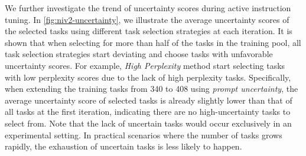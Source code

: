 We further investigate the trend of uncertainty scores during active instruction tuning.
In \autoref{fig:niv2-uncertainty}, we illustrate the average uncertainty scores of the selected tasks using different task selection strategies at each iteration. It is shown that when selecting for more than half of the tasks in the training pool, all task selection strategies start deviating and choose tasks with unfavorable uncertainty scores. For example, \textit{High Perplexity} method start selecting tasks with low perplexity scores due to the lack of high perplexity tasks. Specifically, when extending the training tasks from 340 to 408 using \textit{prompt uncertainty}, the average uncertainty score of selected tasks is already slightly lower than that of all tasks at the first iteration, indicating there are no high-uncertainty tasks to select from.
Note that the lack of uncertain tasks would occur exclusively in an experimental setting. In practical scenarios where the number of tasks grows rapidly, the exhaustion of uncertain tasks is less likely to happen. 


